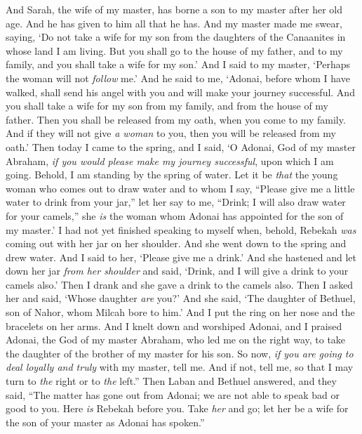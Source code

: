 \begin{biblechapter}
\verse And Sarah, the wife of my master, has borne a son to my master after her old age. And he has given to him all that he has.
\verse And my master made me swear, saying, ‘Do not take a wife for my son from the daughters of the Canaanites in whose land I am living.
\verse But you shall go to the house of my father, and to my family, and you shall take a wife for my son.’
\verse And I said to my master, ‘Perhaps the woman will not \textit{follow} me.’
\verse And he said to me, ‘Adonai, before whom I have walked, shall send his angel with you and will make your journey successful. And you shall take a wife for my son from my family, and from the house of my father.
\verse Then you shall be released from my oath, when you come to my family. And if they will not give \textit{a woman} to you, then you will be released from my oath.’
\verse Then today I came to the spring, and I said, ‘O Adonai, God of my master Abraham, \textit{if you would please make my journey successful}, upon which I am going.
\verse Behold, I am standing by the spring of water. Let it be \textit{that} the young woman who comes out to draw water and to whom I say, “Please give me a little water to drink from your jar,”
\verse let her say to me, “Drink; I will also draw water for your camels,” she \textit{is} the woman whom Adonai has appointed for the son of my master.’
\verse I had not yet finished speaking to myself when, behold, Rebekah \textit{was} coming out with her jar on her shoulder. And she went down to the spring and drew water. And I said to her, ‘Please give me a drink.’
\verse And she hastened and let down her jar \textit{from her shoulder} and said, ‘Drink, and I will give a drink to your camels also.’ Then I drank and she gave a drink to the camels also.
\verse Then I asked her and said, ‘Whose daughter \textit{are} you?’ And she said, ‘The daughter of Bethuel, son of Nahor, whom Milcah bore to him.’ And I put the ring on her nose and the bracelets on her arms.
\verse And I knelt down and worshiped Adonai, and I praised Adonai, the God of my master Abraham, who led me on the right way, to take the daughter of the brother of my master for his son.
\verse So now, \textit{if you are going to deal loyally and truly} with my master, tell me. And if not, tell me, so that I may turn to \textit{the} right or to \textit{the} left.”
\verse Then Laban and Bethuel answered, and they said, “The matter has gone out from Adonai; we are not able to speak bad or good to you.
\verse Here \textit{is} Rebekah before you. Take \textit{her} and go; let her be a wife for the son of your master as Adonai has spoken.”

\end{biblechapter}
